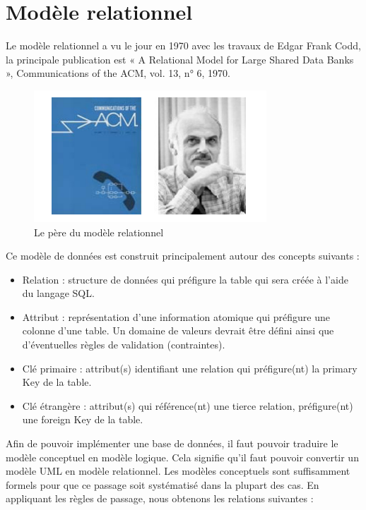 \section{Modèle relationnel}
Le modèle relationnel a vu le jour en 1970 avec les travaux de Edgar Frank 
Codd, la principale publication est « A Relational Model for Large Shared Data 
Banks », Communications of the ACM, vol. 13, n° 6, 1970.\\

\begin{figure}[h!]
    \centering
    \includegraphics[scale=1]{images/pere_mr.PNG}
    \caption{Le père du modèle relationnel}
    \label{fig48}
\end{figure}
        
Ce modèle de données est construit principalement autour des concepts suivants \cite{11}:

\begin{itemize}
    \item[\textbullet] Relation : structure de données qui préfigure la table qui 
        sera créée à l’aide du langage SQL.
    \item[\textbullet]  Attribut  : représentation d’une information atomique qui 
        préfigure une colonne d’une table. Un domaine de valeurs devrait être défini 
        ainsi que d’éventuelles règles de validation (contraintes).
    \item[\textbullet] Clé primaire : attribut(s) identifiant une relation qui 
        préfigure(nt) la primary Key de la table.
    \item[\textbullet] Clé étrangère : attribut(s) qui référence(nt) une tierce 
        relation, préfigure(nt) une foreign Key de la table.             
\end{itemize}

Afin de pouvoir implémenter une base de données, il faut pouvoir traduire le 
modèle conceptuel en modèle logique. Cela signifie qu’il faut pouvoir convertir 
un modèle UML en modèle relationnel. Les modèles conceptuels sont suffisamment 
formels pour que ce passage soit systématisé dans la plupart des cas. 
En appliquant les règles de passage\cite{12}, nous obtenons les relations suivantes :

